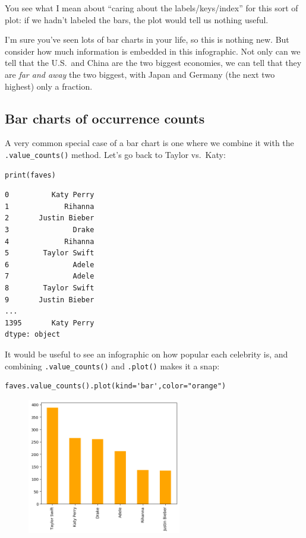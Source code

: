 You see what I mean about ``caring about the labels/keys/index'' for this sort
of plot: if we hadn't labeled the bars, the plot would tell us nothing useful.

I'm sure you've seen lots of bar charts in your life, so this is nothing new.
But consider how much information is embedded in this infographic. Not only can
we tell that the U.S.~and China are the two biggest economies, we can tell that
they are \textit{far and away} the two biggest, with Japan and Germany (the
next two highest) only a fraction.

\subsection{Bar charts of occurrence counts}


A very common special case of a bar chart is one where we combine it with the
\texttt{.value\_counts()} method. Let's go back to Taylor vs.~Katy:

\begin{Verbatim}[fontsize=\scriptsize,samepage=true,frame=single,framesep=3mm]
print(faves)
\end{Verbatim}
\vspace{-.3in}

\begin{Verbatim}[fontsize=\scriptsize,samepage=true,frame=leftline,framesep=5mm,framerule=1mm]
0          Katy Perry
1             Rihanna
2       Justin Bieber
3               Drake
4             Rihanna
5        Taylor Swift
6               Adele
7               Adele
8        Taylor Swift
9       Justin Bieber
...
1395       Katy Perry
dtype: object
\end{Verbatim}


It would be useful to see an infographic on how popular each celebrity is, and
combining \texttt{.value\_counts()} and \texttt{.plot()} makes it a snap:

\begin{Verbatim}[fontsize=\small,samepage=true,frame=single,framesep=3mm]
faves.value_counts().plot(kind='bar',color="orange")
\end{Verbatim}

\begin{figure}[ht]
\centering
\includegraphics[width=0.6\textwidth]{celebs.png}
\end{figure}

